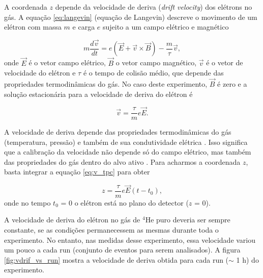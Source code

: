 \documentclass[a4paper,12pt,oneside]{book}
\begin{document}
\par A coordenada $z$ depende da velocidade de deriva (\textit{drift velocity}) dos elétrons no gás. A equação \ref{eq:langevin} (equação de Langevin) descreve o movimento de um elétron com massa $m$ e carga $e$ sujeito a um campo elétrico e magnético \cite{drift_constant}

\begin{equation}\label{eq:langevin}
    m\frac{d\vec{v}}{dt} = e\left(\vec{E} +\vec{v}\times \vec{B}\right) - \frac{m}{\tau}\vec{v},
\end{equation}
%
onde $\vec{E}$ é o vetor campo elétrico, $\vec{B}$ o vetor campo magnético, $\vec{v}$ é o vetor de velocidade do elétron e $\tau$ é o tempo de colisão médio, que depende das propriedades termodinâmicas do gás. No caso deste experimento, $\vec{B}$ é zero e a solução estacionária para a velocidade de deriva do elétron é

\begin{equation}\label{eq:v_tpc}
    \vec{v} = \frac{\tau}{m}e\vec{E}.
\end{equation}

\par A velocidade de deriva depende das propriedades termodinâmicas do gás (temperatura, pressão) e também de sua condutividade elétrica \cite{drift_constant}. Isso significa que a calibração da velocidade não depende só do campo elétrico, mas também das propriedades do gás dentro do alvo ativo \cite{pattpc, drift_constant}. Para acharmos a coordenada $z$, basta integrar a equação \ref{eq:v_tpc} para obter

\begin{equation}
    z = \frac{\tau}{m}e\vec{E}(t - t_0),
\end{equation}
%
onde no tempo $t_0$ = 0 o elétron está no plano do detector ($z$ = 0).

\par A velocidade de deriva do elétron no gás de $^4$He puro deveria ser sempre constante, se as condições permanecessem as mesmas durante toda o experimento. No entanto, nas medidas desse experimento, essa velocidade variou um pouco a cada run (conjunto de eventos para serem analisados). A figura \ref{fig:vdrif_vs_run} mostra a velocidade de deriva obtida para cada run ($\sim$ 1 h) do experimento.
\end{document}

